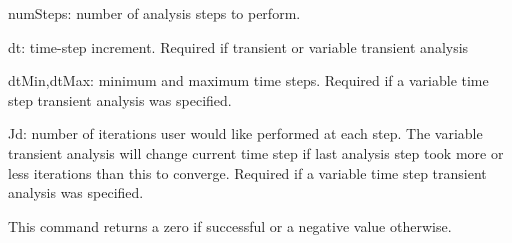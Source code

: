 \begin{description}
  \item{numSteps}: number of analysis steps to perform.
  \item{dt}: time-step increment. Required if transient or variable transient analysis
  \item{dtMin,dtMax}: minimum and maximum time steps. Required if a variable time step transient analysis was specified.
  \item{Jd}: number of iterations user would like performed at each step. The variable transient analysis will change current time step if last analysis step took more or less iterations than this to converge. Required if a variable time step transient analysis was specified.
\end{description}

This command returns a zero if successful or a negative value otherwise.

